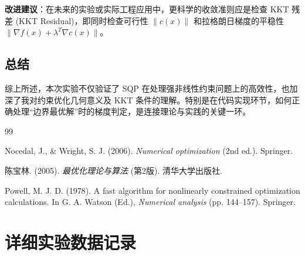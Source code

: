 \documentclass[a4paper,12pt]{article}
\begin{document}
\textbf{改进建议}：在未来的实验或实际工程应用中，更科学的收敛准则应是检查 KKT 残差 (KKT Residual)，即同时检查可行性 $\|c(x)\|$ 和拉格朗日梯度的平稳性 $\|\nabla f(x) + \lambda^T \nabla c(x)\|$。

\subsection{总结}
综上所述，本次实验不仅验证了 SQP 在处理强非线性约束问题上的高效性，也加深了我对约束优化几何意义及 KKT 条件的理解。特别是在代码实现环节，如何正确处理“边界最优解”时的梯度判定，是连接理论与实践的关键一环。



\begin{thebibliography}{99}

 Nocedal, J., \& Wright, S. J. (2006). \textit{Numerical optimization} (2nd ed.). Springer.

 陈宝林. (2005). \textit{最优化理论与算法} (第2版). 清华大学出版社.

 Powell, M. J. D. (1978). A fast algorithm for nonlinearly constrained optimization calculations. In G. A. Watson (Ed.), \textit{Numerical analysis} (pp. 144--157). Springer.

\end{thebibliography}

\clearpage %

\appendix %

\renewcommand{\thetable}{\thesection.\arabic{table}}
\renewcommand{\thefigure}{\thesection.\arabic{figure}}


\section{详细实验数据记录} \label{app:data}
\setcounter{table}{0}
\setcounter{figure}{0}
\end{document}
